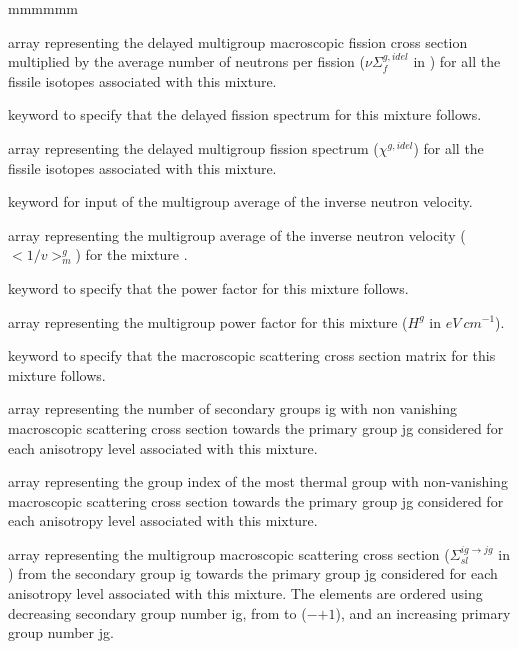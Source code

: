 \begin{ListeDeDescription}{mmmmmm}
\item[\dusa{xssigd}] array representing the delayed multigroup macroscopic fission
cross section multiplied by the average number
of neutrons per fission ($\nu\Sigma_{f}^{g,idel}$ in \xsunit) for all the fissile
isotopes associated with this mixture. 

\item[\moc{CHDL}] keyword to specify that the delayed fission spectrum for this mixture
follows.

\item[\dusa{xschid}] array representing the delayed multigroup fission spectrum
($\chi^{g,idel}$) for all the fissile isotopes associated with this mixture.

\item[\moc{OVERV}] keyword for input of the multigroup average of the inverse neutron velocity.

\item[\dusa{overv}] array representing the multigroup average of the inverse neutron velocity ($<1/v>_{m}^g$) for the mixture 
. 

\item[\moc{H-FACTOR}] keyword to specify that the power factor for
this mixture follows.

\item[\dusa{hfact}] array representing the multigroup power factor for this
mixture ($H^{g}$ in $eV~cm^{-1}$). 

\item[\moc{SCAT}] keyword to specify that the macroscopic scattering cross
section matrix for this mixture follows.

\item[\dusa{nbscat}] array representing the number of secondary groups ig with
non vanishing macroscopic scattering cross section towards the primary group jg
considered for each anisotropy level associated with this mixture.

\item[\dusa{ilastg}] array representing the group index of the most thermal
group with non-vanishing macroscopic scattering cross section towards the
primary group jg considered for each anisotropy level associated with this
mixture.

\item[\dusa{xsscat}] array representing the multigroup macroscopic scattering
cross section ($\Sigma_{sl}^{ig\to jg}$ in \xsunit) from the secondary group ig
towards the primary group jg considered for each anisotropy level associated
with this mixture. The elements are ordered using decreasing secondary group
number ig, from  to ($-$$+1$), and an
increasing primary group number jg.

\end{ListeDeDescription}

